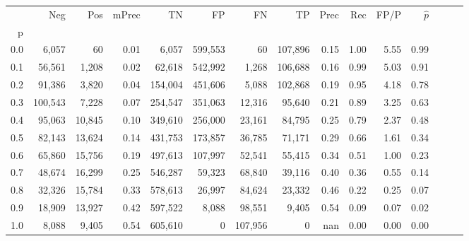 \begin{tabular}{rrrrrrrrrrrrrrr}
\toprule
{} &      Neg &     Pos & mPrec &       TN &       FP &       FN &       TP &  Prec &   Rec &  FP/P & $\hat{p}$ \\
p   &          &         &       &          &          &          &          &       &       &       &           \\
\midrule
0.0 &    6,057 &      60 &  0.01 &    6,057 &  599,553 &       60 &  107,896 &  0.15 &  1.00 &  5.55 &      0.99 \\
0.1 &   56,561 &   1,208 &  0.02 &   62,618 &  542,992 &    1,268 &  106,688 &  0.16 &  0.99 &  5.03 &      0.91 \\
0.2 &   91,386 &   3,820 &  0.04 &  154,004 &  451,606 &    5,088 &  102,868 &  0.19 &  0.95 &  4.18 &      0.78 \\
0.3 &  100,543 &   7,228 &  0.07 &  254,547 &  351,063 &   12,316 &   95,640 &  0.21 &  0.89 &  3.25 &      0.63 \\
0.4 &   95,063 &  10,845 &  0.10 &  349,610 &  256,000 &   23,161 &   84,795 &  0.25 &  0.79 &  2.37 &      0.48 \\
0.5 &   82,143 &  13,624 &  0.14 &  431,753 &  173,857 &   36,785 &   71,171 &  0.29 &  0.66 &  1.61 &      0.34 \\
0.6 &   65,860 &  15,756 &  0.19 &  497,613 &  107,997 &   52,541 &   55,415 &  0.34 &  0.51 &  1.00 &      0.23 \\
0.7 &   48,674 &  16,299 &  0.25 &  546,287 &   59,323 &   68,840 &   39,116 &  0.40 &  0.36 &  0.55 &      0.14 \\
0.8 &   32,326 &  15,784 &  0.33 &  578,613 &   26,997 &   84,624 &   23,332 &  0.46 &  0.22 &  0.25 &      0.07 \\
0.9 &   18,909 &  13,927 &  0.42 &  597,522 &    8,088 &   98,551 &    9,405 &  0.54 &  0.09 &  0.07 &      0.02 \\
1.0 &    8,088 &   9,405 &  0.54 &  605,610 &        0 &  107,956 &        0 &   nan &  0.00 &  0.00 &      0.00 \\
\bottomrule
\end{tabular}
